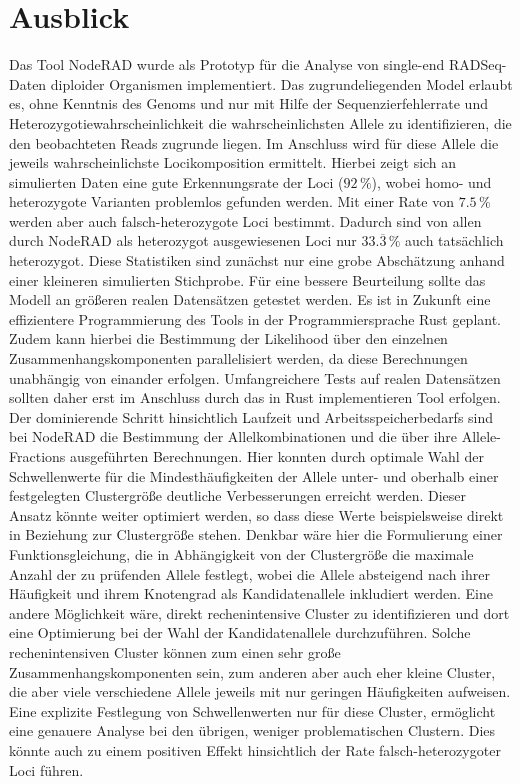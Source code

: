 \chapter{Ausblick} \label{sec:ausblick}

Das Tool NodeRAD \cite{noderad} wurde als Prototyp für die Analyse von single-end RADSeq-Daten diploider Organismen implementiert. Das zugrundeliegenden Model erlaubt es, ohne Kenntnis des Genoms und nur mit Hilfe der Sequenzierfehlerrate und Heterozygotiewahrscheinlichkeit die wahrscheinlichsten Allele zu identifizieren, die den beobachteten Reads zugrunde liegen. Im Anschluss wird für diese Allele die jeweils wahrscheinlichste Locikomposition ermittelt. Hierbei zeigt sich an simulierten Daten eine gute Erkennungsrate der Loci ($ 92\, \% $), wobei homo- und heterozygote Varianten problemlos gefunden werden. Mit einer Rate von $ 7.5\, \% $ werden aber auch falsch-heterozygote Loci bestimmt. Dadurch sind von allen durch NodeRAD als heterozygot ausgewiesenen Loci nur $ 33.\overline{3}\, \% $ auch tatsächlich heterozygot. Diese Statistiken sind zunächst nur eine grobe Abschätzung anhand einer kleineren simulierten Stichprobe. Für eine bessere Beurteilung sollte das Modell an größeren realen Datensätzen getestet werden. Es ist in Zukunft eine effizientere Programmierung des Tools in der Programmiersprache Rust geplant. Zudem kann hierbei die Bestimmung der Likelihood über den einzelnen Zusammenhangskomponenten parallelisiert werden, da diese Berechnungen unabhängig von einander erfolgen. Umfangreichere Tests auf realen Datensätzen sollten daher erst im Anschluss durch das in Rust implementieren Tool erfolgen. \\

Der dominierende Schritt hinsichtlich Laufzeit und Arbeitsspeicherbedarfs sind bei NodeRAD die Bestimmung der Allelkombinationen und die über ihre Allele-Fractions ausgeführten Berechnungen. Hier konnten durch optimale Wahl der Schwellenwerte für die Mindesthäufigkeiten der Allele unter- und oberhalb einer festgelegten Clustergröße deutliche Verbesserungen erreicht werden. Dieser Ansatz könnte weiter optimiert werden, so dass diese Werte beispielsweise direkt in Beziehung zur Clustergröße stehen. Denkbar wäre hier die Formulierung einer Funktionsgleichung, die in Abhängigkeit von der Clustergröße die maximale Anzahl der zu prüfenden Allele festlegt, wobei die Allele absteigend nach ihrer Häufigkeit und ihrem Knotengrad als Kandidatenallele inkludiert werden. Eine andere Möglichkeit wäre, direkt rechenintensive Cluster zu identifizieren und dort eine Optimierung bei der Wahl der Kandidatenallele durchzuführen. Solche rechenintensiven Cluster können zum einen sehr große Zusammenhangskomponenten sein, zum anderen aber auch eher kleine Cluster, die aber viele verschiedene Allele jeweils mit nur geringen Häufigkeiten aufweisen. Eine explizite Festlegung von Schwellenwerten nur für diese Cluster, ermöglicht eine genauere Analyse bei den übrigen, weniger problematischen Clustern. Dies könnte auch zu einem positiven Effekt hinsichtlich der Rate falsch-heterozygoter Loci führen. \\


